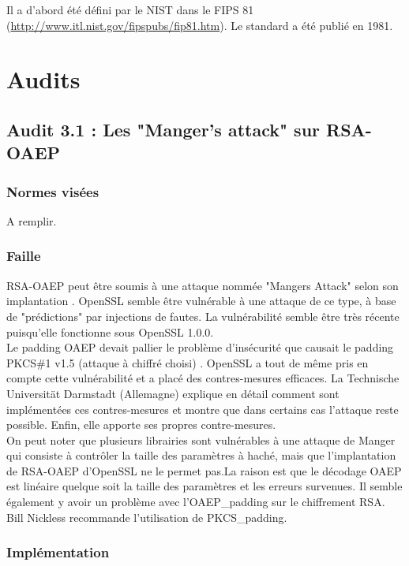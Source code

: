 Il a d'abord été défini par le NIST dans le FIPS 81 (\url{http://www.itl.nist.gov/fipspubs/fip81.htm}). Le standard a été publié en 1981.


\section{Audits}
\subsection{Audit 3.1 : Les "Manger's attack" sur RSA-OAEP}
\subsubsection{Normes visées}

A remplir.

\subsubsection{Faille}

RSA-OAEP peut être soumis à une attaque nommée "Mangers Attack" selon son implantation \cite{mangers2010falko}. OpenSSL semble être vulnérable à une attaque de ce type, à base de "prédictions" par injections de fautes. La vulnérabilité semble être très récente puisqu'elle fonctionne sous OpenSSL 1.0.0.\\


Le padding OAEP devait pallier le problème d'insécurité que causait le padding PKCS\#1 v1.5 (attaque à chiffré choisi) \cite{bleichenbacherPCKS}. OpenSSL a tout de même pris en compte cette vulnérabilité et a placé des contres-mesures efficaces. La Technische Universität Darmstadt (Allemagne) explique en détail comment sont implémentées ces contres-mesures et montre que dans certains cas l'attaque reste possible. Enfin, elle apporte ses propres contre-mesures.\\

On peut noter que plusieurs librairies sont vulnérables à une attaque de Manger qui consiste à contrôler la taille des paramètres à haché, mais que l'implantation de RSA-OAEP d'OpenSSL ne le permet pas.La raison est que le décodage OAEP est linéaire quelque soit la taille des paramètres et les erreurs survenues. Il semble également y avoir un problème avec l'OAEP\_padding sur le chiffrement RSA. Bill Nickless recommande l'utilisation de PKCS\_padding. \cite{sourceforgeRSAbroken}	\\


\subsubsection{Implémentation}


